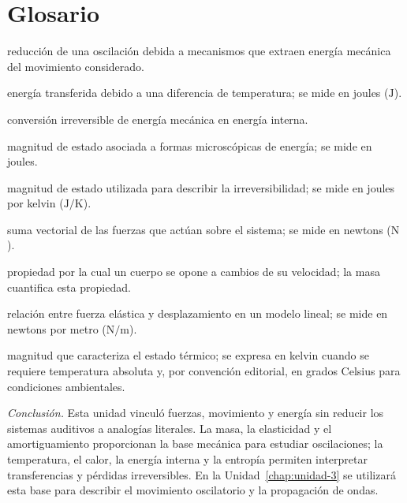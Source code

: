 \section{Glosario}
\label{sec:u2-glosario}

\begin{description}[nosep]
    \item[\textbf{Amortiguamiento:}] reducción de una oscilación debida a mecanismos que extraen energía mecánica del movimiento considerado.
    \item[\textbf{Calor (\(Q\)):}] energía transferida debido a una diferencia de temperatura; se mide en joules (\(\text{J}\)).
    \item[\textbf{Disipación:}] conversión irreversible de energía mecánica en energía interna.
    \item[\textbf{Energía interna (\(U\)):}] magnitud de estado asociada a formas microscópicas de energía; se mide en joules.
    \item[\textbf{Entropía (\(S\)):}] magnitud de estado utilizada para describir la irreversibilidad; se mide en joules por kelvin (\(\text{J}/\text{K}\)).
    \item[\textbf{Fuerza neta:}] suma vectorial de las fuerzas que actúan sobre el sistema; se mide en newtons (\(\text{N}\)).
    \item[\textbf{Inercia:}] propiedad por la cual un cuerpo se opone a cambios de su velocidad; la masa cuantifica esta propiedad.
    \item[\textbf{Rigidez (\(k\)):}] relación entre fuerza elástica y desplazamiento en un modelo lineal; se mide en newtons por metro (\(\text{N}/\text{m}\)).
    \item[\textbf{Temperatura:}] magnitud que caracteriza el estado térmico; se expresa en kelvin cuando se requiere temperatura absoluta y, por convención editorial, en grados Celsius para condiciones ambientales.
\end{description}

\bigskip
\noindent\emph{Conclusión.} Esta unidad vinculó fuerzas, movimiento y energía sin reducir los sistemas auditivos a analogías literales. La masa, la elasticidad y el amortiguamiento proporcionan la base mecánica para estudiar oscilaciones; la temperatura, el calor, la energía interna y la entropía permiten interpretar transferencias y pérdidas irreversibles. En la Unidad~\ref{chap:unidad-3} se utilizará esta base para describir el movimiento oscilatorio y la propagación de ondas.

